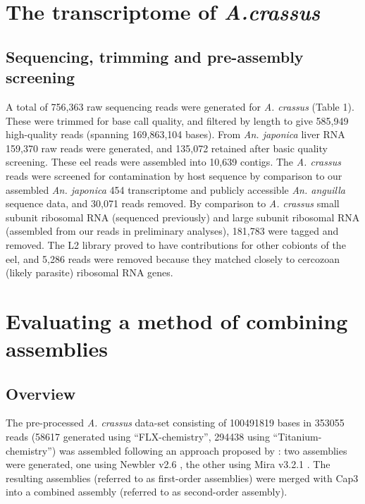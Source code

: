 \documentclass[12pt,a4paper]{article}
\begin{document}
\newpage
\clearpage


\section{The transcriptome of \textit{A.crassus}}


\subsection{Sequencing, trimming and pre-assembly screening}

 A total of 756,363 raw sequencing reads were generated for
 \textit{A. crassus} (Table 1). These were trimmed for base call
 quality, and filtered by length to give 585,949 high-quality reads
 (spanning 169,863,104 bases). From \textit{An. japonica} liver RNA
 159,370 raw reads were generated, and 135,072 retained after basic
 quality screening. These eel reads were assembled into 10,639
 contigs. The \textit{A. crassus} reads were screened for
 contamination by host sequence by comparison to our assembled
 \textit{An. japonica} 454 transcriptome and publicly accessible
 \textit{An. anguilla} sequence data, and 30,071 reads removed. By
 comparison to \textit{A. crassus} small subunit ribosomal RNA
 (sequenced previously) and large subunit ribosomal RNA (assembled
 from our reads in preliminary analyses), 181,783 were tagged and
 removed. The L2 library proved to have contributions for other
 cobionts of the eel, and 5,286 reads were removed because they
 matched closely to cercozoan (likely parasite) ribosomal RNA genes.





\section{ Evaluating a method of combining assemblies}

\subsection{Overview}
\label{sec:overview}

The pre-processed \textit{A. crassus} data-set consisting of
100491819 bases in 353055 reads (58617
generated using ``FLX-chemistry'', 294438 using
``Titanium-chemistry'') was assembled following an approach proposed
by \cite{pmid20950480}: two assemblies were generated, one using
Newbler v2.6 \cite{pmid16056220}, the other using Mira v3.2.1
\cite{miraEST}. The resulting assemblies (referred to as first-order
assemblies) were merged with Cap3 \cite{Cap3_Huang} into a combined
assembly (referred to as second-order assembly).
\end{document}

